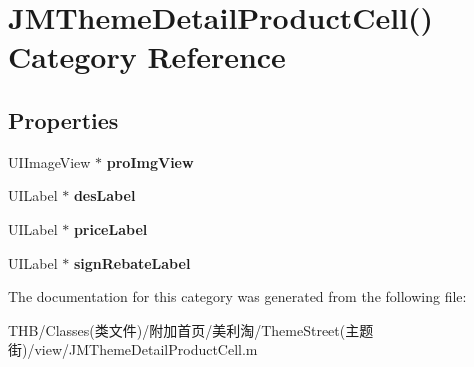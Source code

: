 \hypertarget{category_j_m_theme_detail_product_cell_07_08}{}\section{J\+M\+Theme\+Detail\+Product\+Cell() Category Reference}
\label{category_j_m_theme_detail_product_cell_07_08}
\subsection*{Properties}
\begin{DoxyCompactItemize}
\item 
\mbox{\label{category_j_m_theme_detail_product_cell_07_08_adc1e31c3dff2b467e76aceb5b40abf6e}} 
U\+I\+Image\+View $\ast$ {\bfseries pro\+Img\+View}
\item 
\mbox{\label{category_j_m_theme_detail_product_cell_07_08_acc56136f450bf2b29f4d2d99e2b18687}} 
U\+I\+Label $\ast$ {\bfseries des\+Label}
\item 
\mbox{\label{category_j_m_theme_detail_product_cell_07_08_a3515e9b268ed8cef3bc1a9c8a7fdb9b3}} 
U\+I\+Label $\ast$ {\bfseries price\+Label}
\item 
\mbox{\label{category_j_m_theme_detail_product_cell_07_08_a23c8813e5c5a3ee45ee8ac0816e6e21a}} 
U\+I\+Label $\ast$ {\bfseries sign\+Rebate\+Label}
\end{DoxyCompactItemize}


The documentation for this category was generated from the following file\+:\begin{DoxyCompactItemize}
\item 
T\+H\+B/\+Classes(类文件)/附加首页/美利淘/\+Theme\+Street(主题街)/view/J\+M\+Theme\+Detail\+Product\+Cell.\+m\end{DoxyCompactItemize}

